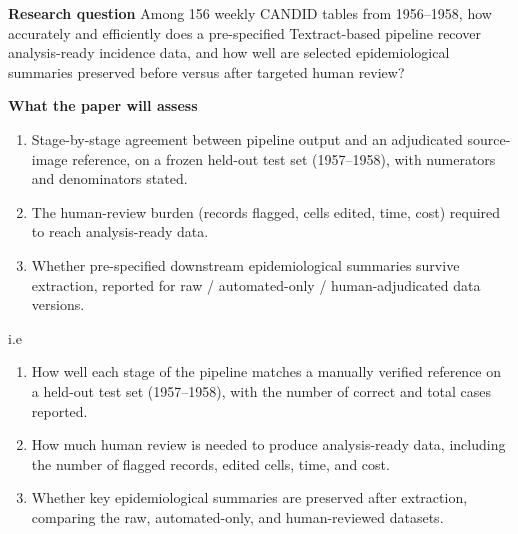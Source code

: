 \documentclass[12pt]{article}
\begin{document}
\textbf{Research question}
Among 156 weekly CANDID tables from 1956–1958, how accurately and efficiently does a pre-specified Textract-based pipeline recover analysis-ready incidence data, and how well are selected epidemiological summaries preserved before versus after targeted human review?

\textbf{What the paper will assess}
\begin{enumerate}
    \item Stage-by-stage agreement between pipeline output and an adjudicated source-image reference, on a frozen held-out test set (1957–1958), with numerators and denominators stated.
    \item The human-review burden (records flagged, cells edited, time, cost) required to reach analysis-ready data.
    \item Whether pre-specified downstream epidemiological summaries survive extraction, reported for raw / automated-only / human-adjudicated data versions.
\end{enumerate}

i.e

\begin{enumerate}
    \item How well each stage of the pipeline matches a manually verified reference on a held-out test set (1957--1958), with the number of correct and total cases reported.
    \item How much human review is needed to produce analysis-ready data, including the number of flagged records, edited cells, time, and cost.
    \item Whether key epidemiological summaries are preserved after extraction, comparing the raw, automated-only, and human-reviewed datasets.
\end{enumerate}
\end{document}
